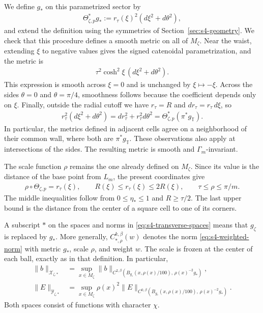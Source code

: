 \documentclass[a4paper,11pt,oneside,reqno]{amsart}
\numberwithin{equation}{section}
\theoremstyle{definition}
\begin{document}
We define $g_*$ on this parametrized sector by
%
\begin{align}
    \label{eq:s4-model-metric}
    \Theta_{\zeta,p}^*g_*
    :=r_\tau(\xi)^2(d\xi^2+d\theta^2),
\end{align}
%
and extend the definition using the symmetries of
Section~\ref{sec:s4-geometry}. We check that this
procedure defines a smooth metric on all of $M_\zeta$.
Near the waist, extending $\xi$ to negative values
gives the signed catenoidal parametrization, and the
metric is
%
\begin{align*}
    \tau^2\cosh^2\xi\,(d\xi^2+d\theta^2).
\end{align*}
%
This expression is smooth across $\xi=0$ and is
unchanged by $\xi\mapsto-\xi$. Across the sides
$\theta=0$ and $\theta=\pi/4$, smoothness follows
because the coefficient depends only on $\xi$.
Finally, outside the radial cutoff we have
$r_\tau=R$ and $dr_\tau=r_\tau\,d\xi$, so
%
\begin{align*}
    r_\tau^2(d\xi^2+d\theta^2)
    =dr_\tau^2+r_\tau^2d\theta^2
    =\Theta_{\zeta,p}^*(\pi^*g_{\mathbb T}).
\end{align*}
%
In particular, the metrics defined in adjacent cells
agree on a neighborhood of their common wall, where
both are $\pi^*g_{\mathbb T}$. These observations also
apply at intersections of the sides. The resulting
metric is smooth and $\Gamma_m$-invariant.

The scale function $\rho$ remains the one already
defined on $M_\zeta$. Since its value is the distance
of the base point from $L_m$, the present coordinates
give
%
\begin{align}
    \label{eq:s4-model-scale}
    \rho\circ\Theta_{\zeta,p}=r_\tau(\xi),
    \qquad R(\xi)\leq r_\tau(\xi)\leq2R(\xi),
    \qquad \tau\leq\rho\leq\pi/m.
\end{align}
%
The middle inequalities follow from
$0\leq\eta_*\leq1$ and $R\geq\tau/2$.
The last upper bound is the distance from the center
of a square cell to one of its corners.

A subscript $*$ on the spaces and norms in
\eqref{eq:s4-transverse-spaces} means that $g_\zeta$
is replaced by $g_*$. More generally,
$C^{k,\beta}_{*,\rho}(w)$ denotes the norm
\eqref{eq:s4-weighted-norm} with metric $g_*$,
scale $\rho$, and weight $w$. The scale is frozen at
the center of each ball, exactly as in that definition.
In particular,
%
\begin{align*}
    \|b\|_{\mathcal X_{\zeta,*}}
    &=\sup_{x\in M_\zeta}
      \|b\|_{C^{2,\beta}
       (B_{g_*}(x,\rho(x)/100),\,\rho(x)^{-2}g_*)},\\
    \|E\|_{\mathcal Y_{\zeta,*}}
    &=\sup_{x\in M_\zeta}\rho(x)^2
      \|E\|_{C^{0,\beta}
       (B_{g_*}(x,\rho(x)/100),\,\rho(x)^{-2}g_*)}.
\end{align*}
%
Both spaces consist of functions with character $\chi$.
\end{document}
